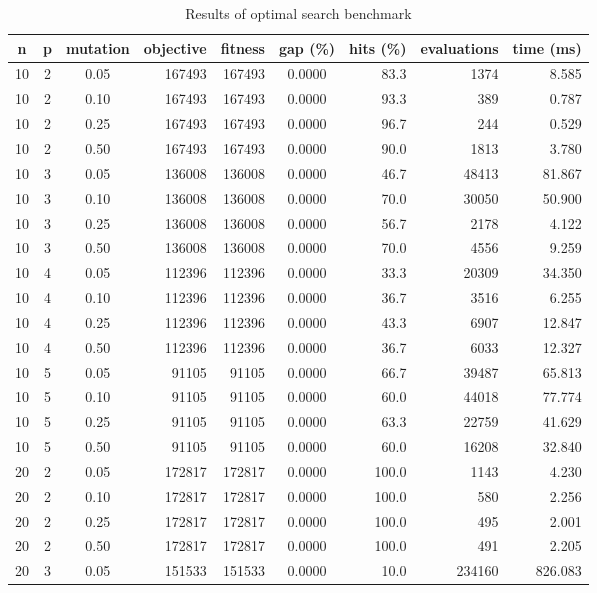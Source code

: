 \begin{table}
\caption{Results of optimal search benchmark}
\label{tb:optimal_benchmark}
\begin{center}
  \begin{tabular}{|c|c|c|r|r|c|r|r|r|}
\hline
n & p & mutation & objective & fitness & gap (\%) & hits (\%) & evaluations & time (ms) \\
\hline
10 & 2 & 0.05 & 167493 & 167493 &  0.0000 & 83.3 & 1374 & 8.585 \\
10 & 2 & 0.10 & 167493 & 167493 &  0.0000 & 93.3 & 389 & 0.787 \\
10 & 2 & 0.25 & 167493 & 167493 &  0.0000 & 96.7 & 244 & 0.529 \\
10 & 2 & 0.50 & 167493 & 167493 &  0.0000 & 90.0 & 1813 & 3.780 \\
10 & 3 & 0.05 & 136008 & 136008 &  0.0000 & 46.7 & 48413 & 81.867 \\
10 & 3 & 0.10 & 136008 & 136008 &  0.0000 & 70.0 & 30050 & 50.900 \\
10 & 3 & 0.25 & 136008 & 136008 &  0.0000 & 56.7 & 2178 & 4.122 \\
10 & 3 & 0.50 & 136008 & 136008 &  0.0000 & 70.0 & 4556 & 9.259 \\
10 & 4 & 0.05 & 112396 & 112396 &  0.0000 & 33.3 & 20309 & 34.350 \\
10 & 4 & 0.10 & 112396 & 112396 &  0.0000 & 36.7 & 3516 & 6.255 \\
10 & 4 & 0.25 & 112396 & 112396 &  0.0000 & 43.3 & 6907 & 12.847 \\
10 & 4 & 0.50 & 112396 & 112396 &  0.0000 & 36.7 & 6033 & 12.327 \\
10 & 5 & 0.05 & 91105 & 91105 &  0.0000 & 66.7 & 39487 & 65.813 \\
10 & 5 & 0.10 & 91105 & 91105 &  0.0000 & 60.0 & 44018 & 77.774 \\
10 & 5 & 0.25 & 91105 & 91105 &  0.0000 & 63.3 & 22759 & 41.629 \\
10 & 5 & 0.50 & 91105 & 91105 &  0.0000 & 60.0 & 16208 & 32.840 \\
20 & 2 & 0.05 & 172817 & 172817 &  0.0000 & 100.0 & 1143 & 4.230 \\
20 & 2 & 0.10 & 172817 & 172817 &  0.0000 & 100.0 & 580 & 2.256 \\
20 & 2 & 0.25 & 172817 & 172817 &  0.0000 & 100.0 & 495 & 2.001 \\
20 & 2 & 0.50 & 172817 & 172817 &  0.0000 & 100.0 & 491 & 2.205 \\
20 & 3 & 0.05 & 151533 & 151533 &  0.0000 & 10.0 & 234160 & 826.083 \\

\end{tabular}
\end{center}
\end{table}
